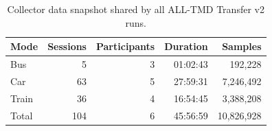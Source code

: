 \begin{table}[htbp]
\centering
\caption{Collector data snapshot shared by all ALL-TMD Transfer v2 runs.}
\label{tab:transfer-v2-collector-snapshot}
\begin{tabular}{lrrrr}
\hline
\textbf{Mode} & \textbf{Sessions} & \textbf{Participants} & \textbf{Duration} & \textbf{Samples} \\
\hline
Bus & 5 & 3 & 01:02:43 & 192,228 \\
Car & 63 & 5 & 27:59:31 & 7,246,492 \\
Train & 36 & 4 & 16:54:45 & 3,388,208 \\
\hline
Total & 104 & 6 & 45:56:59 & 10,826,928 \\
\hline
\end{tabular}
\end{table}
